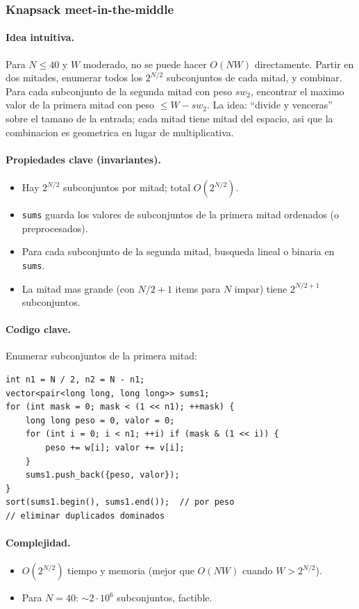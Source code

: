 ﻿\subsubsection{Knapsack meet-in-the-middle}

\paragraph{Idea intuitiva.}
Para $N \le 40$ y $W$ moderado, no se puede hacer $O(NW)$ directamente. Partir en dos mitades, enumerar todos los $2^{N/2}$ subconjuntos de cada mitad, y combinar. Para cada subconjunto de la segunda mitad con peso $sw_2$, encontrar el maximo valor de la primera mitad con peso $\le W - sw_2$. La idea: ``divide y venceras'' sobre el tamano de la entrada; cada mitad tiene mitad del espacio, asi que la combinacion es geometrica en lugar de multiplicativa.

\paragraph{Propiedades clave (invariantes).}
\begin{itemize}\setlength\itemsep{0pt}
	\item Hay $2^{N/2}$ subconjuntos por mitad; total $O(2^{N/2})$.
	\item \texttt{sums} guarda los valores de subconjuntos de la primera mitad ordenados (o preprocesados).
	\item Para cada subconjunto de la segunda mitad, busqueda lineal o binaria en \texttt{sums}.
	\item La mitad mas grande (con $N/2 + 1$ items para $N$ impar) tiene $2^{N/2+1}$ subconjuntos.
\end{itemize}

\paragraph{Codigo clave.}
Enumerar subconjuntos de la primera mitad:
\begin{verbatim}
int n1 = N / 2, n2 = N - n1;
vector<pair<long long, long long>> sums1;
for (int mask = 0; mask < (1 << n1); ++mask) {
    long long peso = 0, valor = 0;
    for (int i = 0; i < n1; ++i) if (mask & (1 << i)) {
        peso += w[i]; valor += v[i];
    }
    sums1.push_back({peso, valor});
}
sort(sums1.begin(), sums1.end());  // por peso
// eliminar duplicados dominados
\end{verbatim}

\paragraph{Complejidad.}
\begin{itemize}\setlength\itemsep{0pt}
	\item $O(2^{N/2})$ tiempo y memoria (mejor que $O(NW)$ cuando $W > 2^{N/2}$).
	\item Para $N = 40$: $\sim 2 \cdot 10^6$ subconjuntos, factible.
\end{itemize}

